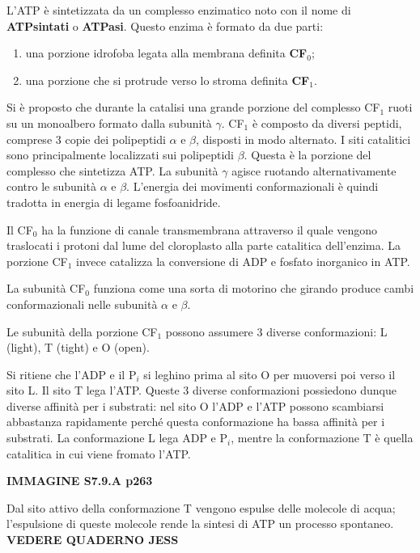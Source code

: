 \documentclass[]{article}
\begin{document}
L'ATP è sintetizzata da un complesso enzimatico noto con il nome di
\textbf{ATPsintati} o \textbf{ATPasi}. Questo enzima è formato da due
parti:

\begin{enumerate}
\def\labelenumi{\arabic{enumi}.}
\itemsep1pt\parskip0pt
\item
  una porzione idrofoba legata alla membrana definita \textbf{CF$_0$};
\item
  una porzione che si protrude verso lo stroma definita \textbf{CF$_1$}.
\end{enumerate}

Si è proposto che durante la catalisi una grande porzione del complesso
CF$_1$ ruoti su un monoalbero formato dalla subunità $\gamma$. CF$_1$ è
composto da diversi peptidi, comprese 3 copie dei polipeptidi $\alpha$ e
$\beta$, disposti in modo alternato. I siti catalitici sono
principalmente localizzati sui polipeptidi $\beta$. Questa è la porzione
del complesso che sintetizza ATP. La subunità $\gamma$ agisce ruotando
alternativamente contro le subunità $\alpha$ e $\beta$. L'energia dei
movimenti conformazionali è quindi tradotta in energia di legame
fosfoanidride.

Il CF$_0$ ha la funzione di canale transmembrana attraverso il quale
vengono traslocati i protoni dal lume del cloroplasto alla parte
catalitica dell'enzima. La porzione CF$_1$ invece catalizza la
conversione di ADP e fosfato inorganico in ATP.

La subunità CF$_0$ funziona come una sorta di motorino che girando
produce cambi conformazionali nelle subunità $\alpha$ e $\beta$.

Le subunità della porzione CF$_1$ possono assumere 3 diverse
conformazioni: L (light), T (tight) e O (open).

Si ritiene che l'ADP e il P$_i$ si leghino prima al sito O per muoversi
poi verso il sito L. Il sito T lega l'ATP. Queste 3 diverse
conformazioni possiedono dunque diverse affinità per i substrati: nel
sito O l'ADP e l'ATP possono scambiarsi abbastanza rapidamente perché
questa conformazione ha bassa affinità per i substrati. La conformazione
L lega ADP e P$_i$, mentre la conformazione T è quella catalitica in cui
viene fromato l'ATP.

\textbf{IMMAGINE S7.9.A p263}

Dal sito attivo della conformazione T vengono espulse delle molecole di
acqua; l'espulsione di queste molecole rende la sintesi di ATP un
processo spontaneo. \textbf{VEDERE QUADERNO JESS}
\end{document}
